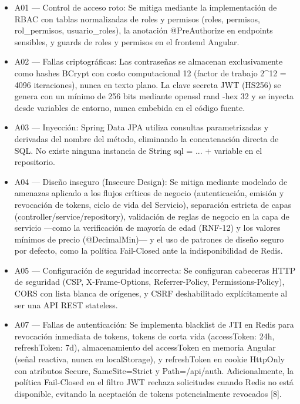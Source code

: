\documentclass[
]{article}
\begin{document}
\begin{itemize}
\item
  A01 --- Control de acceso roto: Se mitiga mediante la implementación
  de RBAC con tablas normalizadas de roles y permisos (roles, permisos,
  rol\_permisos, usuario\_roles), la anotación @PreAuthorize en
  endpoints sensibles, y guards de roles y permisos en el frontend
  Angular.
\item
  A02 --- Fallas criptográficas: Las contraseñas se almacenan
  exclusivamente como hashes BCrypt con costo computacional 12 (factor
  de trabajo 2\^{}12 = 4096 iteraciones), nunca en texto plano. La clave
  secreta JWT (HS256) se genera con un mínimo de 256 bits mediante
  openssl rand -hex 32 y se inyecta desde variables de entorno, nunca
  embebida en el código fuente.
\item
  A03 --- Inyección: Spring Data JPA utiliza consultas parametrizadas y
  derivadas del nombre del método, eliminando la concatenación directa
  de SQL. No existe ninguna instancia de String sql = ... + variable en
  el repositorio.
\item
  A04 --- Diseño inseguro (Insecure Design): Se mitiga mediante modelado
  de amenazas aplicado a los flujos críticos de negocio (autenticación,
  emisión y revocación de tokens, ciclo de vida del Servicio),
  separación estricta de capas (controller/service/repository),
  validación de reglas de negocio en la capa de servicio ---como la
  verificación de mayoría de edad (RNF-12) y los valores mínimos de
  precio (@DecimalMin)--- y el uso de patrones de diseño seguro por
  defecto, como la política Fail-Closed ante la indisponibilidad de
  Redis.
\item
  A05 --- Configuración de seguridad incorrecta: Se configuran cabeceras
  HTTP de seguridad (CSP, X-Frame-Options, Referrer-Policy,
  Permissions-Policy), CORS con lista blanca de orígenes, y CSRF
  deshabilitado explícitamente al ser una API REST stateless.
\item
  A07 --- Fallas de autenticación: Se implementa blacklist de JTI en
  Redis para revocación inmediata de tokens, tokens de corta vida
  (accessToken: 24h, refreshToken: 7d), almacenamiento del accessToken
  en memoria Angular (señal reactiva, nunca en localStorage), y
  refreshToken en cookie HttpOnly con atributos Secure, SameSite=Strict
  y Path=/api/auth. Adicionalmente, la política Fail-Closed en el filtro
  JWT rechaza solicitudes cuando Redis no está disponible, evitando la
  aceptación de tokens potencialmente revocados {[}8{]}.
\end{itemize}
\end{document}
